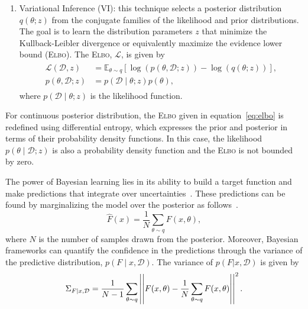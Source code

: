\begin{enumerate}
%
\item Variational Inference (VI): this technique selects a posterior
distribution $q(\theta;z)$ from the conjugate families of the likelihood and
prior distributions. The goal is to learn the distribution parameters $z$ that
minimize the Kullback-Leibler divergence or equivalently maximize the evidence
lower bound (\textsc{Elbo}). The \textsc{Elbo}, $\mathcal{L}$, is given
by~\cite{cohen2016bayesian}
\begin{align}
  \begin{split}
  \mathcal{L}(\mathcal{D},z) &= \mathbb{E}_{\theta \sim q} \left[\log(p(\theta, \mathcal{D};z)) - \log(q(\theta;z)) \right], \\
  p(\theta, \mathcal{D};z) &= p(\mathcal{D} \mid \theta;z)p(\theta),
  \end{split}
  \label{eq:elbo}
\end{align}
where $p(\mathcal{D} \mid \theta;z)$ is the likelihood function. 
\end{enumerate}
\begin{rem}
  For continuous posterior distribution, the \textsc{Elbo} given in
  equation~\eqref{eq:elbo} is redefined using differential entropy, which
  expresses the prior and posterior in terms of their probability density
  functions. In this case, the likelihood $p(\theta \mid \mathcal{D};z)$ is also
  a probability density function and the \textsc{Elbo} is not bounded by zero.
\end{rem}

The power of Bayesian learning lies in its ability to build a target function
and make predictions that integrate over
uncertainties~\cite{tipping2003bayesian}. These predictions can be found by
marginalizing the model over the posterior as follows~\cite{jospin2020hands}.
\begin{equation}
  \hat{F}(x) = \frac{1}{N} \sum_{\theta \sim q} F(x, \theta),
  \label{eqn:marginalization}
\end{equation} 
where $N$ is the number of samples drawn from the posterior. Moreover, Bayesian
frameworks can quantify the confidence in the predictions through the variance
of the predictive distribution, $p(F \mid x, \mathcal{D})$. The variance of
$p(F|x, \mathcal{D})$ is given by~\cite{jospin2020hands}
\begin{equation}
  \Sigma_{F \mid x,\mathcal{D}} = \frac{1}{N-1} \sum_{\theta \sim q} \left|\left|F(x,\theta) - \frac{1}{N} \sum_{\theta \sim q} F(x, \theta)\right|\right|^2.
  \label{eqn:predictive_variance}
\end{equation}
%
